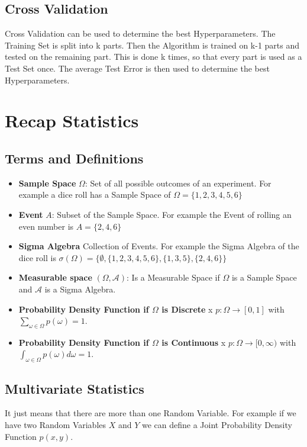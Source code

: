 \documentclass[a4paper]{article}
\begin{document}
\subsection{Cross Validation}
Cross Validation can be used to determine the best Hyperparameters. The Training Set is split into k parts. Then the Algorithm is trained on k-1 parts and tested on the remaining part. This is done k times, so that every part is used as a Test Set once. The average Test Error is then used to determine the best Hyperparameters. 

\section{Recap Statistics}
\subsection{Terms and Definitions}
\begin{itemize}
    \item \textbf{Sample Space} $\Omega$: Set of all possible outcomes of an experiment. For example a dice roll has a Sample Space of $\Omega = \{1,2,3,4,5,6\}$
    \item \textbf{Event} $A$: Subset of the Sample Space. For example the Event of rolling an even number is $A = \{2,4,6\}$
    \item \textbf{Sigma Algebra} Collection of Events. For example the Sigma Algebra of the dice roll is $\sigma(\Omega) = \{\emptyset, \{1,2,3,4,5,6\}, \{1,3,5\}, \{2,4,6\}\}$
    \item \textbf{Measurable space} $(\Omega, \mathcal{A})$: Is a Measurable Space if $\Omega$ is a Sample Space and $\mathcal{A}$ is a Sigma Algebra.
\end{itemize}

\begin{itemize}
    \item \textbf{Probability Density Function if $\Omega$ is Discrete} x $p: \Omega \rightarrow [0,1]$ with $\sum_{\omega \in \Omega} p(\omega) = 1$. 
    \item \textbf{Probability Density Function if $\Omega$ is Continuous} x $p: \Omega \rightarrow [0,\infty)$ with $\int_{\omega \in \Omega} p(\omega) d\omega = 1$.
\end{itemize}

\subsection{Multivariate Statistics}
It just means that there are more than one Random Variable. For example if we have two Random Variables $X$ and $Y$ we can define a Joint Probability Density Function $p(x,y)$.
\end{document}
